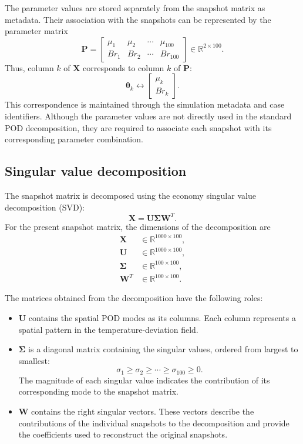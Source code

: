 The parameter values are stored separately from the snapshot
matrix as metadata. Their association with the snapshots can
be represented by the parameter matrix
\[
\mathbf{P}
=
\begin{bmatrix}
\mu_1 & \mu_2 & \cdots & \mu_{100}\\
Br_1 & Br_2 & \cdots & Br_{100}
\end{bmatrix}
\in\mathbb{R}^{2\times100}.
\]
Thus, column $k$ of $\mathbf{X}$ corresponds to column $k$
of $\mathbf{P}$:
\[
\boldsymbol{\theta}_k
\longleftrightarrow
\begin{bmatrix}
\mu_k\\
Br_k
\end{bmatrix}.
\]
This correspondence is maintained through the simulation
metadata and case identifiers. Although the parameter values
are not directly used in the standard POD decomposition,
they are required to associate each snapshot with its
corresponding parameter combination.

\subsection{Singular value decomposition}

The snapshot matrix is decomposed using the economy singular
value decomposition (SVD):
\[
\boxed{
\mathbf{X}=\mathbf{U}\mathbf{\Sigma}\mathbf{W}^{T}.
}
\]
For the present snapshot matrix, the dimensions of the
decomposition are
\[
\begin{aligned}
\mathbf{X}&\in\mathbb{R}^{1000\times100},\\
\mathbf{U}&\in\mathbb{R}^{1000\times100},\\
\mathbf{\Sigma}&\in\mathbb{R}^{100\times100},\\
\mathbf{W}^{T}&\in\mathbb{R}^{100\times100}.
\end{aligned}
\]

The matrices obtained from the decomposition have the
following roles:
\begin{itemize}
    \item $\mathbf{U}$ contains the spatial POD modes as its
    columns. Each column represents a spatial pattern in the
    temperature-deviation field.

    \item $\mathbf{\Sigma}$ is a diagonal matrix containing
    the singular values, ordered from largest to smallest:
    \[
    \sigma_1\geq\sigma_2\geq\cdots\geq\sigma_{100}\geq0.
    \]
    The magnitude of each singular value indicates the
    contribution of its corresponding mode to the snapshot
    matrix.

    \item $\mathbf{W}$ contains the right singular vectors.
    These vectors describe the contributions of the individual
    snapshots to the decomposition and provide the coefficients
    used to reconstruct the original snapshots.
\end{itemize}

